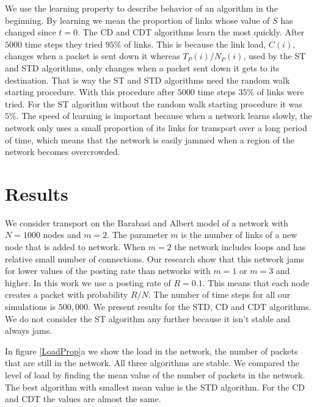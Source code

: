 \documentclass[runningheads]{llncs}
\begin{document}
We use the learning property to describe behavior of an algorithm in
the beginning. By learning we mean the proportion of links whose
value of $S$ has changed since $t=0$. The CD and CDT algorithms
learn the most quickly. After $5000$ time steps they tried $95\%$ of
links. This is because the link load, $C(i)$, changes when a packet
is sent down it whereas $T_P(i)/ N_P(i)$, used by the ST and STD
algorithms, only changes when a packet sent down it gets to its
destination. That is way the ST and STD algorithms need the random
walk starting procedure. With this procedure after $5000$ time steps
$35\%$ of links were tried. For the ST algorithm without the random
walk starting procedure it was $5\%$. The speed of learning is
important because when a network learns slowly, the network only
uses a small proportion of its links for transport over a long
period of time, which means that the network is easily jammed when a
region of the network becomes overcrowded.


\section{Results}
We consider transport on the Barabasi and Albert model of a network
\cite{Albert_base} with $N=1000$ nodes and $m=2$. The parameter $m$
is the number of links of a new node that is added to network. When
$m=2$ the network includes loops and has relative small number of
connections. Our research show that this network jams for lower
values of the posting rate than networks with $m=1$ or $m=3$ and
higher. In this work we use a posting rate of $R=0.1$. This means
that each node creates a packet with probability $R/N$. The number
of time steps for all our simulations is $500,000$. We present
results for the STD, CD and CDT algorithms. We do not consider the
ST algorithm any further because it isn't stable and always jams.

In figure \ref{LoadProp}a we show the load in the network,
the number of packets that are still in the network.  All
three algorithms are stable. We compared the level of load by
finding the mean value of the number of packets in the network. The
best algorithm with smallest mean value is the STD algorithm. For
the CD and CDT the values are almost the same.
\end{document}

